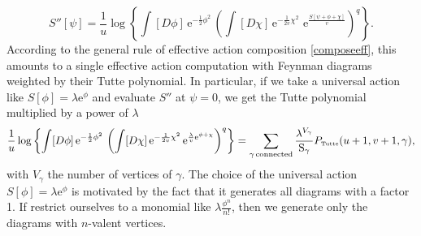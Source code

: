 \documentclass[10pt,here,feynmf]{article}
\begin{document}
\begin{equation}
S''[\psi]=\frac{1}{u}\log\left\{
\int[D\phi]\,\mathrm{e}^{-\frac{1}{2}\phi^{2}}\,
\left(
\int[D\chi]\,\mathrm{e}^{-\frac{1}{2v}\chi^{2}}\,
\,\mathrm{e}^{\frac{S[\psi+\phi+\chi]}{v}}
\right)^{q}
\right\}.
\end{equation} 
According to the general rule of effective action composition \eqref{composeeff}, this amounts to a single effective action computation with Feynman diagrams weighted by their Tutte polynomial. In particular, if we take a universal action like $S[\phi]=\lambda\mathrm{e}^{\phi}$ and evaluate $S''$ at $\psi=0$, we get the Tutte polynomial multiplied by a power of $\lambda$
\begin{equation}
\frac{1}{u}\log\left\{
\int[D\phi]\,\mathrm{e}^{-\frac{1}{2}\phi^{2}}\,
\left(
\int[D\chi]\,\mathrm{e}^{-\frac{1}{2v}\chi^{2}}\,
\mathrm{e}^{\frac{\lambda}{v}\mathrm{e}^{\phi+\chi}}
\right)^{q}
\right\}=\sum_{\gamma\,\mathrm{connected}}
\frac{\lambda^{V_{\gamma}}}{\mathrm{S}_{\gamma}}P_{\mbox{\tiny Tutte}}(u+1,v+1,\gamma),
\label{generating}
\end{equation} 
with $V_{\gamma}$ the number of vertices of $\gamma$.
The choice of the universal action $S[\phi]=\lambda\mathrm{e}^{\phi}$ is motivated by the fact that it generates all diagrams with a factor 1. If restrict ourselves to a monomial like $\lambda\frac{\phi^{n}}{n!}$, then we generate only the diagrams with $n$-valent vertices. 
\end{document}
